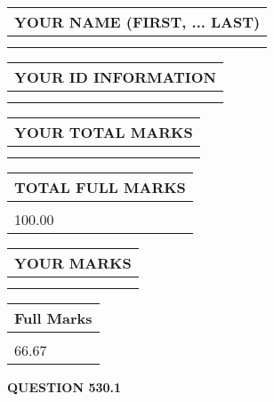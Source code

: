 \documentclass{ctexart}
\begin{document}
   
   
   
\newpage 
\setcounter{page}{ 
   530001 } 
   
   
   
   
\noindent\begin{tabular}{|l|}
\hline
YOUR NAME (FIRST, ... LAST)  \\
\hline
 \\ 
 \\ 
\hline
\end{tabular}
\hspace{0.05in} \begin{tabular}{|l|}
\hline
 YOUR   ID   INFORMATION  \\
\hline
 \\ 
 \\ 
\hline
\end{tabular}
   
   
\vspace{0.2in}\noindent\begin{tabular}{|l|}
\hline
YOUR TOTAL MARKS  \\
\hline
 \\ 
 \\ 
\hline
\end{tabular}
\hspace{0.05in} \begin{tabular}{|l|}
\hline
TOTAL FULL MARKS  \\
\hline
 \\ 
100.00 \\
\hline
\end{tabular}
   
   
 \vspace{0.2in}
 
 
 
 
   
   
  
\vspace{0.2in}
  
\noindent\begin{tabular}{|l|}
\hline
 YOUR MARKS  \\
\hline
 \\ 
 \\ 
\hline
\end{tabular}
\hspace{0.05in} \begin{tabular}{|l|}
\hline
 Full Marks  \\
\hline
 \\ 
66.67 \\
\hline
\end{tabular}
{\textbf{\Large{QUESTION
530.1 
}}}
  
\end{document}
